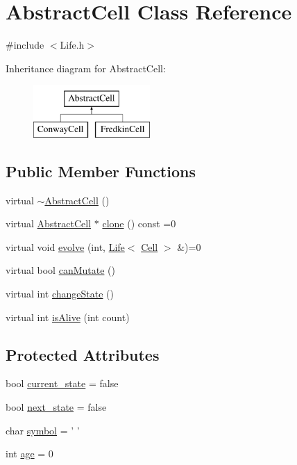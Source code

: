 \hypertarget{classAbstractCell}{\section{Abstract\-Cell Class Reference}
\label{classAbstractCell}
}


{\ttfamily \#include $<$Life.\-h$>$}

Inheritance diagram for Abstract\-Cell\-:\begin{figure}[H]
\begin{center}
\leavevmode
\includegraphics[height=2.000000cm]{classAbstractCell}
\end{center}
\end{figure}
\subsection*{Public Member Functions}
\begin{DoxyCompactItemize}
\item 
virtual \hyperlink{classAbstractCell_a4576179f57220c4342edd9b01563df63}{$\sim$\-Abstract\-Cell} ()
\item 
virtual \hyperlink{classAbstractCell}{Abstract\-Cell} $\ast$ \hyperlink{classAbstractCell_a1a95a7ea92b3503e2f042170b6320354}{clone} () const =0
\item 
virtual void \hyperlink{classAbstractCell_a3400569dbc73b019698bead4aca5b186}{evolve} (int, \hyperlink{classLife}{Life}$<$ \hyperlink{classCell}{Cell} $>$ \&)=0
\item 
virtual bool \hyperlink{classAbstractCell_ad19a847847061bcbe642932ba34713b3}{can\-Mutate} ()
\item 
virtual int \hyperlink{classAbstractCell_a86553456ecaaeb0d7e94b92e123540b6}{change\-State} ()
\item 
virtual int \hyperlink{classAbstractCell_ac4bba10e2bc5da7fe5c601d04c75821f}{is\-Alive} (int count)
\end{DoxyCompactItemize}
\subsection*{Protected Attributes}
\begin{DoxyCompactItemize}
\item 
bool \hyperlink{classAbstractCell_a738a87fd7a98a0bbeb723d0690b07e97}{current\-\_\-state} = false
\item 
bool \hyperlink{classAbstractCell_a196b0194fb5cd8701b0aae28d12a0586}{next\-\_\-state} = false
\item 
char \hyperlink{classAbstractCell_ad763295e814970b07d31d98b560a4b19}{symbol} = ' '
\item 
int \hyperlink{classAbstractCell_a99e95bd6e878d85cb33a9fe90c4b7d25}{age} = 0
\end{DoxyCompactItemize}
